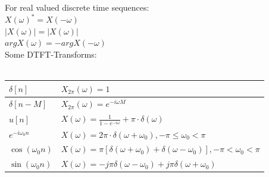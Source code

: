 For real valued discrete time sequences:\\
	$X(\omega)^* = X(-\omega)$ \\
	$|X(\omega)| = |X(\omega)|$\\
	$argX(\omega) = -argX(-\omega)$\\

Some DTFT-Transforms: \\ \\
\begin{tabularx}{0.7\textwidth}{|l|X|}
	\hline
	$\delta[n]$ &	$X_{2\pi}(\omega) = 1$ \\
	\hline 	
	$\delta[n-M]$ &	$X_{2\pi}(\omega) = e^{-i\omega M}$ \\
	\hline
	$u[n]$ & %
	$X(\omega) = \frac{1}{1-e^{-i \omega}} + \pi \cdot \delta (\omega) $ \\
	\hline
	$e^{-i \omega_0 n}$ &	$X(\omega) = 2\pi\cdot \delta (\omega +\omega_0),     -\pi \leq \omega_0 < \pi$ \\
	\hline
	$\cos(\omega_0 n) $ & $X(\omega) = \pi [\delta (\omega +\omega_0)+\delta (\omega -\omega_0)],     -\pi < \omega_0 < \pi $\\
	\hline
	$\sin(\omega_0 n) $ & $X(\omega) = -j \pi \delta(\omega - \omega_0) + j \pi \delta(\omega + \omega_0)$\\
	\hline
\end{tabularx} \\ \\

\newpage

